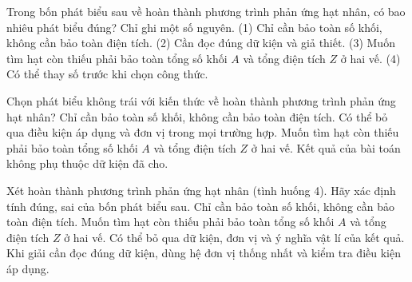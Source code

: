 \begin{ex}
Trong bốn phát biểu sau về hoàn thành phương trình phản ứng hạt nhân, có bao nhiêu phát biểu đúng? Chỉ ghi một số nguyên. (1) Chỉ cần bảo toàn số khối, không cần bảo toàn điện tích. (2) Cần đọc đúng dữ kiện và giả thiết. (3) Muốn tìm hạt còn thiếu phải bảo toàn tổng số khối $A$ và tổng điện tích $Z$ ở hai vế. (4) Có thể thay số trước khi chọn công thức.
\end{ex}

\begin{ex}
Chọn phát biểu không trái với kiến thức về hoàn thành phương trình phản ứng hạt nhân?
\choice
{Chỉ cần bảo toàn số khối, không cần bảo toàn điện tích.}
{Có thể bỏ qua điều kiện áp dụng và đơn vị trong mọi trường hợp.}
{\True Muốn tìm hạt còn thiếu phải bảo toàn tổng số khối $A$ và tổng điện tích $Z$ ở hai vế.}
{Kết quả của bài toán không phụ thuộc dữ kiện đã cho.}
\end{ex}

\begin{ex}
Xét hoàn thành phương trình phản ứng hạt nhân (tình huống 4). Hãy xác định tính đúng, sai của bốn phát biểu sau.
\choiceTF
{Chỉ cần bảo toàn số khối, không cần bảo toàn điện tích.}
{\True Muốn tìm hạt còn thiếu phải bảo toàn tổng số khối $A$ và tổng điện tích $Z$ ở hai vế.}
{Có thể bỏ qua dữ kiện, đơn vị và ý nghĩa vật lí của kết quả.}
{\True Khi giải cần đọc đúng dữ kiện, dùng hệ đơn vị thống nhất và kiểm tra điều kiện áp dụng.}
\end{ex}

